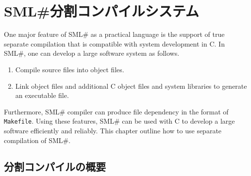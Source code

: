 \documentclass{jbook}
\newif\ifjp
\newcommand{\txt}[2]{#1}
\newcommand{\smlsharp}{SML\#}
\begin{document}
\chapter{
\txt{\smlsharp{}分割コンパイルシステム}
 {Separate compilation in \smlsharp{}}
}
\label{chap:tutorialSeparatecompilation}

\ifjp%
	実用言語としての\smlsharp{}の大きな特徴は，完全な分割コンパイル
のサポートです．
	以下の手順で大規模なプログラムを開発していくことができます．
\begin{enumerate}
\item 個々のプログラムモジュールのオブジェクトファイルへのコンパイル
\item オブジェクトファイルを，C言語のオブジェクトファイルやシステムライ
ブラリとともにリンクし実行形式ファイルを作成する．
\end{enumerate}
	さらに\smlsharp{}コンパイラは，各オブジェクトの依存関係をシステ
ムの{\tt make}コマンドが解釈できる形式で出力することができます．
	この機能を使用すれば，C言語などとともに大規模システムを効率よく
開発することが可能です．
	本章では，この分割コンパイルシステムの概要を説明します．
\else%
	One major feature of \smlsharp{} as a practical language is the
support of  true separate compilation that is compatible with system
development in C.
	In \smlsharp{}, one can develop a large software system as follows.
\begin{enumerate}
\item Compile source files into object files.
\item Link object files and additional C object files and system
libraries to generate an executable file.
\end{enumerate}
	Furthermore, \smlsharp{} compiler can produce file dependency in
the format of {\tt Makefile}.
	Using these features, \smlsharp{} can be used with C to develop
a large software efficiently and reliably.
	This chapter outline how to use separate compilation of \smlsharp.
\fi%

\section{\txt{分割コンパイルの概要}{Separate compilation overview}}
\label{sec:tutorialSeparateCompilation}
\end{document}
